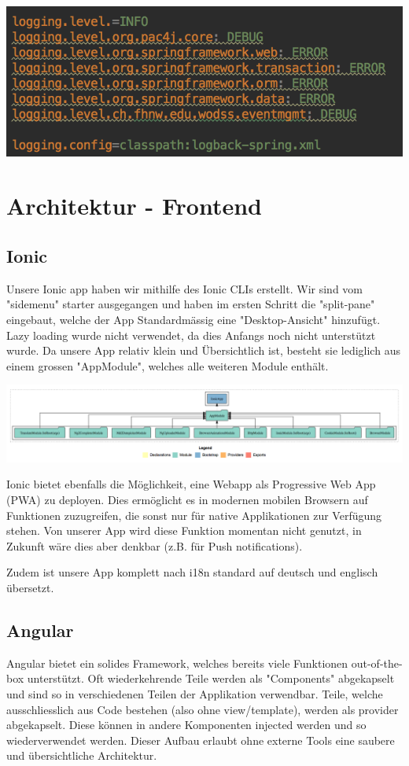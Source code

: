 \documentclass[11pt]{article} %
\begin{document}
\includegraphics[width=1\textwidth]{log-config}

\newpage
\section{Architektur - Frontend}
\subsection{Ionic}
Unsere Ionic app haben wir mithilfe des Ionic CLIs erstellt. Wir sind vom "sidemenu" starter ausgegangen und haben im ersten Schritt die "split-pane" eingebaut, welche der App Standardmässig eine "Desktop-Ansicht" hinzufügt. Lazy loading wurde nicht verwendet, da dies Anfangs noch nicht unterstützt wurde. Da unsere App relativ klein und Übersichtlich ist, besteht sie lediglich aus einem grossen "AppModule", welches alle weiteren Module enthält.

\includegraphics[width=1\textwidth]{ionic-architecture}

Ionic bietet ebenfalls die Möglichkeit, eine Webapp als Progressive Web App (PWA) zu deployen. Dies ermöglicht es in modernen mobilen Browsern auf Funktionen zuzugreifen, die sonst nur für native Applikationen zur Verfügung stehen. Von unserer App wird diese Funktion momentan nicht genutzt, in Zukunft wäre dies aber denkbar (z.B. für Push notifications).

Zudem ist unsere App komplett nach i18n standard auf deutsch und englisch übersetzt.

\subsection{Angular}
Angular bietet ein solides Framework, welches bereits viele Funktionen out-of-the-box unterstützt. Oft wiederkehrende Teile werden als "Components" abgekapselt und sind so in verschiedenen Teilen der Applikation verwendbar. Teile, welche ausschliesslich aus Code bestehen (also ohne view/template), werden als provider abgekapselt. Diese können in andere Komponenten injected werden und so wiederverwendet werden. Dieser Aufbau erlaubt ohne externe Tools eine saubere und übersichtliche Architektur.
\end{document}
